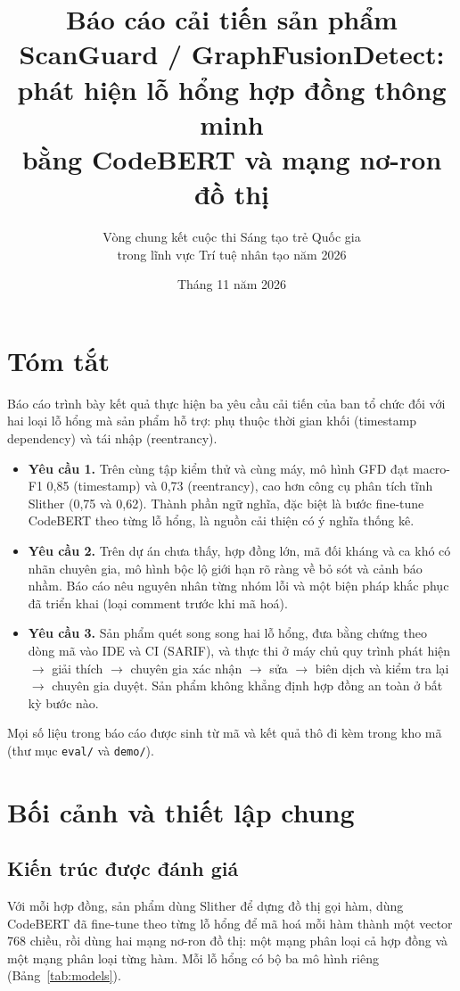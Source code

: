 \documentclass[12pt,a4paper]{article}
\title{\textbf{Báo cáo cải tiến sản phẩm}\\[4pt]\large ScanGuard / GraphFusionDetect: phát hiện lỗ hổng hợp đồng thông minh\\bằng CodeBERT và mạng nơ-ron đồ thị}
\author{Vòng chung kết cuộc thi Sáng tạo trẻ Quốc gia\\trong lĩnh vực Trí tuệ nhân tạo năm 2026}
\date{Tháng 11 năm 2026}
\newcommand{\code}[1]{\texttt{#1}}
\begin{document}
\maketitle

\section*{Tóm tắt}
Báo cáo trình bày kết quả thực hiện ba yêu cầu cải tiến của ban tổ chức đối với hai loại lỗ hổng mà sản phẩm hỗ trợ: phụ thuộc thời gian khối (timestamp dependency) và tái nhập (reentrancy).
\begin{itemize}
\item \textbf{Yêu cầu 1.} Trên cùng tập kiểm thử và cùng máy, mô hình GFD đạt macro-F1 0{,}85 (timestamp) và 0{,}73 (reentrancy), cao hơn công cụ phân tích tĩnh Slither (0{,}75 và 0{,}62). Thành phần ngữ nghĩa, đặc biệt là bước fine-tune CodeBERT theo từng lỗ hổng, là nguồn cải thiện có ý nghĩa thống kê.
\item \textbf{Yêu cầu 2.} Trên dự án chưa thấy, hợp đồng lớn, mã đối kháng và ca khó có nhãn chuyên gia, mô hình bộc lộ giới hạn rõ ràng về bỏ sót và cảnh báo nhầm. Báo cáo nêu nguyên nhân từng nhóm lỗi và một biện pháp khắc phục đã triển khai (loại comment trước khi mã hoá).
\item \textbf{Yêu cầu 3.} Sản phẩm quét song song hai lỗ hổng, đưa bằng chứng theo dòng mã vào IDE và CI (SARIF), và thực thi ở máy chủ quy trình phát hiện $\rightarrow$ giải thích $\rightarrow$ chuyên gia xác nhận $\rightarrow$ sửa $\rightarrow$ biên dịch và kiểm tra lại $\rightarrow$ chuyên gia duyệt. Sản phẩm không khẳng định hợp đồng an toàn ở bất kỳ bước nào.
\end{itemize}
Mọi số liệu trong báo cáo được sinh từ mã và kết quả thô đi kèm trong kho mã (thư mục \code{eval/} và \code{demo/}).

\tableofcontents
\newpage

\section{Bối cảnh và thiết lập chung}
\subsection{Kiến trúc được đánh giá}
Với mỗi hợp đồng, sản phẩm dùng Slither để dựng đồ thị gọi hàm, dùng CodeBERT đã fine-tune theo từng lỗ hổng để mã hoá mỗi hàm thành một vector 768 chiều, rồi dùng hai mạng nơ-ron đồ thị: một mạng phân loại cả hợp đồng và một mạng phân loại từng hàm. Mỗi lỗ hổng có bộ ba mô hình riêng (Bảng~\ref{tab:models}).
\end{document}
